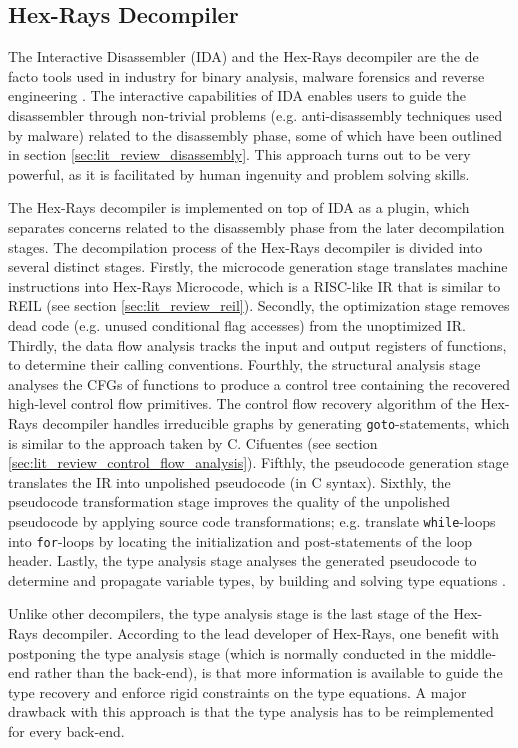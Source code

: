 
\subsection{Hex-Rays Decompiler}
\label{sec:rel_work_hex-rays_decompiler}

The Interactive Disassembler (IDA) and the Hex-Rays decompiler are the de facto tools used in industry for binary analysis, malware forensics and reverse engineering \cite{semantics_preserving_structural_analysis}. The interactive capabilities of IDA enables users to guide the disassembler through non-trivial problems (e.g. anti-disassembly techniques used by malware) related to the disassembly phase, some of which have been outlined in section \ref{sec:lit_review_disassembly}. This approach turns out to be very powerful, as it is facilitated by human ingenuity and problem solving skills.

The Hex-Rays decompiler is implemented on top of IDA as a plugin, which separates concerns related to the disassembly phase from the later decompilation stages. The decompilation process of the Hex-Rays decompiler is divided into several distinct stages. Firstly, the microcode generation stage translates machine instructions into Hex-Rays Microcode, which is a RISC-like IR that is similar to REIL (see section \ref{sec:lit_review_reil}). Secondly, the optimization stage removes dead code (e.g. unused conditional flag accesses) from the unoptimized IR. Thirdly, the data flow analysis tracks the input and output registers of functions, to determine their calling conventions. Fourthly, the structural analysis stage analyses the CFGs of functions to produce a control tree containing the recovered high-level control flow primitives. The control flow recovery algorithm of the Hex-Rays decompiler handles irreducible graphs by generating \texttt{goto}-statements, which is similar to the approach taken by C. Cifuentes (see section \ref{sec:lit_review_control_flow_analysis}). Fifthly, the pseudocode generation stage translates the IR into unpolished pseudocode (in C syntax).  Sixthly, the pseudocode transformation stage improves the quality of the unpolished pseudocode by applying source code transformations; e.g. translate \texttt{while}-loops into \texttt{for}-loops by locating the initialization and post-statements of the loop header. Lastly, the type analysis stage analyses the generated pseudocode to determine and propagate variable types, by building and solving type equations \cite{hexrays}.

Unlike other decompilers, the type analysis stage is the last stage of the Hex-Rays decompiler. According to the lead developer of Hex-Rays, one benefit with postponing the type analysis stage (which is normally conducted in the middle-end rather than the back-end), is that more information is available to guide the type recovery and enforce rigid constraints on the type equations. A major drawback with this approach is that the type analysis has to be reimplemented for every back-end.
